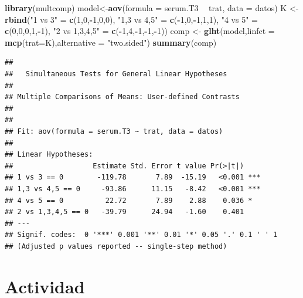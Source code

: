 \documentclass[]{book}
\newenvironment{Shaded}{\begin{snugshade}}{\end{snugshade}}
\newcommand{\KeywordTok}[1]{\textcolor[rgb]{0.13,0.29,0.53}{\textbf{#1}}}
\newcommand{\DataTypeTok}[1]{\textcolor[rgb]{0.13,0.29,0.53}{#1}}
\newcommand{\DecValTok}[1]{\textcolor[rgb]{0.00,0.00,0.81}{#1}}
\newcommand{\StringTok}[1]{\textcolor[rgb]{0.31,0.60,0.02}{#1}}
\newcommand{\OperatorTok}[1]{\textcolor[rgb]{0.81,0.36,0.00}{\textbf{#1}}}
\newcommand{\NormalTok}[1]{#1}
\begin{document}
\begin{Shaded}
\begin{Highlighting}[]
\KeywordTok{library}\NormalTok{(multcomp)}
\NormalTok{model<-}\KeywordTok{aov}\NormalTok{(}\DataTypeTok{formula =}\NormalTok{ serum.T3 }\OperatorTok{~}\StringTok{ }\NormalTok{trat, }\DataTypeTok{data =}\NormalTok{ datos)}
\NormalTok{K <-}\StringTok{ }\KeywordTok{rbind}\NormalTok{(}\StringTok{"1 vs 3"}\NormalTok{ =}\StringTok{ }\KeywordTok{c}\NormalTok{(}\DecValTok{1}\NormalTok{,}\DecValTok{0}\NormalTok{,}\OperatorTok{-}\DecValTok{1}\NormalTok{,}\DecValTok{0}\NormalTok{,}\DecValTok{0}\NormalTok{),}
\StringTok{"1,3 vs 4,5"}\NormalTok{ =}\StringTok{ }\KeywordTok{c}\NormalTok{(}\OperatorTok{-}\DecValTok{1}\NormalTok{,}\DecValTok{0}\NormalTok{,}\OperatorTok{-}\DecValTok{1}\NormalTok{,}\DecValTok{1}\NormalTok{,}\DecValTok{1}\NormalTok{),}
\StringTok{"4 vs 5"}\NormalTok{ =}\StringTok{ }\KeywordTok{c}\NormalTok{(}\DecValTok{0}\NormalTok{,}\DecValTok{0}\NormalTok{,}\DecValTok{0}\NormalTok{,}\DecValTok{1}\NormalTok{,}\OperatorTok{-}\DecValTok{1}\NormalTok{),}
\StringTok{"2 vs 1,3,4,5"}\NormalTok{ =}\StringTok{ }\KeywordTok{c}\NormalTok{(}\OperatorTok{-}\DecValTok{1}\NormalTok{,}\DecValTok{4}\NormalTok{,}\OperatorTok{-}\DecValTok{1}\NormalTok{,}\OperatorTok{-}\DecValTok{1}\NormalTok{,}\OperatorTok{-}\DecValTok{1}\NormalTok{))}
\NormalTok{comp <-}\StringTok{ }\KeywordTok{glht}\NormalTok{(model,}\DataTypeTok{linfct =} \KeywordTok{mcp}\NormalTok{(}\DataTypeTok{trat=}\NormalTok{K),}\DataTypeTok{alternative =} \StringTok{"two.sided"}\NormalTok{)}
\KeywordTok{summary}\NormalTok{(comp)}
\end{Highlighting}
\end{Shaded}

\begin{verbatim}
## 
##   Simultaneous Tests for General Linear Hypotheses
## 
## Multiple Comparisons of Means: User-defined Contrasts
## 
## 
## Fit: aov(formula = serum.T3 ~ trat, data = datos)
## 
## Linear Hypotheses:
##                   Estimate Std. Error t value Pr(>|t|)    
## 1 vs 3 == 0        -119.78       7.89  -15.19   <0.001 ***
## 1,3 vs 4,5 == 0     -93.86      11.15   -8.42   <0.001 ***
## 4 vs 5 == 0          22.72       7.89    2.88    0.036 *  
## 2 vs 1,3,4,5 == 0   -39.79      24.94   -1.60    0.401    
## ---
## Signif. codes:  0 '***' 0.001 '**' 0.01 '*' 0.05 '.' 0.1 ' ' 1
## (Adjusted p values reported -- single-step method)
\end{verbatim}

\section{Actividad}\label{actividad-2}
\end{document}
